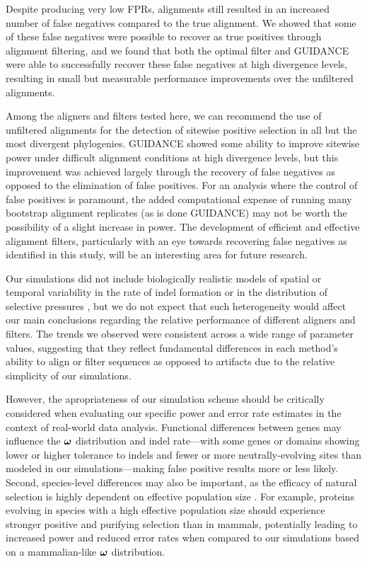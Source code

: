 \documentclass{article}
\begin{document}
Despite producing very low FPRs, \prankc alignments still resulted in
an increased number of false negatives compared to the true
alignment. We showed that some of these false negatives were possible
to recover as true positives through alignment filtering, and we found
that both the optimal filter and GUIDANCE were able to successfully
recover these false negatives at high divergence levels, resulting in
small but measurable performance improvements over the unfiltered
\prankc alignments.

Among the aligners and filters tested here, we can recommend the use
of unfiltered \prankc alignments for the detection of sitewise
positive selection in all but the most divergent phylogenies. GUIDANCE
showed some ability to improve sitewise power under difficult
alignment conditions at high divergence levels, but this improvement
was achieved largely through the recovery of false negatives as
opposed to the elimination of false positives. For an analysis where
the control of false positives is paramount, the added computational
expense of running many bootstrap alignment replicates (as is done
GUIDANCE) may not be worth the possibility of a slight increase in
power. The development of efficient and effective alignment filters,
particularly with an eye towards recovering false negatives as
identified in this study, will be an interesting area for future
research.

Our simulations did not include biologically realistic models of
spatial or temporal variability in the rate of indel formation or in
the distribution of selective pressures \citep{Whelan2008Spatial}, but
we do not expect that such heterogeneity would affect our main
conclusions regarding the relative performance of different aligners
and filters. The trends we observed were consistent across a wide
range of parameter values, suggesting that they reflect fundamental
differences in each method's ability to align or filter sequences as
opposed to artifacts due to the relative simplicity of our
simulations.

However, the apropriateness of our simulation scheme should be
critically considered when evaluating our specific power and error
rate estimates in the context of real-world data analysis. Functional
differences between genes may influence the $\bm{\omega}$ distribution and
indel rate---with some genes or domains showing lower or higher
tolerance to indels and fewer or more neutrally-evolving sites than
modeled in our simulations---making false positive results more or
less likely. Second, species-level differences may also be important,
as the efficacy of natural selection is highly dependent on effective
population size \citep{Ellegren2009Selection}. For example, proteins
evolving in \Dr species with a high effective population size should
experience stronger positive and purifying selection than in mammals,
potentially leading to increased power and reduced error rates when
compared to our simulations based on a mammalian-like $\bm{\omega}$
distribution.
\end{document}
